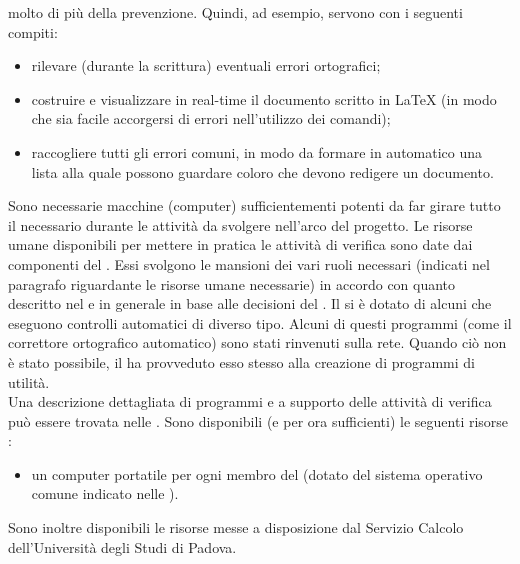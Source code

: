 				molto di più della prevenzione. Quindi, ad esempio, servono  con i seguenti compiti:
				\begin{itemize}
					\item rilevare (durante la scrittura) eventuali errori ortografici;
					\item costruire e visualizzare in real-time il documento scritto in \LaTeX{} (in modo che sia facile accorgersi di errori 
					nell'utilizzo dei comandi);
					\item raccogliere tutti gli errori comuni, in modo da formare in automatico una lista alla quale possono guardare coloro che 
					devono redigere un documento. 
				\end{itemize}
				Sono necessarie macchine (computer) sufficientementi potenti da far girare tutto il  necessario durante le attività da
				svolgere nell'arco del progetto.
				Le risorse umane disponibili per mettere in pratica le attività di verifica sono date dai componenti del . Essi svolgono le 
				mansioni dei vari ruoli necessari (indicati nel paragrafo riguardante le risorse umane necessarie) in accordo con quanto descritto 
				nel  e in generale in base alle decisioni del .
				Il  si è dotato di alcuni  che eseguono controlli automatici di diverso tipo. Alcuni di questi programmi (come il 
				correttore ortografico automatico) sono stati rinvenuti sulla rete. Quando ciò non è stato possibile, il  ha provveduto esso 
				stesso alla creazione di programmi di utilità.\\
				Una descrizione dettagliata di programmi e  a supporto delle attività di verifica può essere trovata nelle .
				Sono disponibili (e per ora sufficienti) le seguenti risorse :
				\begin{itemize}
					\item un computer portatile per ogni membro del  (dotato del sistema operativo comune indicato nelle ).
				\end{itemize}
				Sono inoltre disponibili le risorse  messe a disposizione dal Servizio Calcolo dell'Università degli Studi di Padova.
